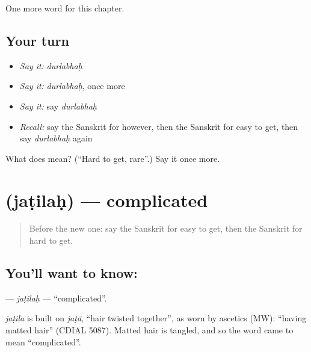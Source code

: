 \begin{grammarlens}[title={What you've built}]
One more word for this chapter.
\end{grammarlens}

\subsection*{Your turn}
\begin{itemize}
\raggedright
  \item \emph{Say it:} \emph{durlabhaḥ}
  \item \emph{Say it:} \emph{durlabhaḥ}, once more
  \item \emph{Say it:} say \emph{durlabhaḥ}
  \item \emph{Recall:} say the Sanskrit for however, then the Sanskrit for easy to get, then say \emph{durlabhaḥ} again
\end{itemize}

\begin{tcolorbox}[breakable,colback=teal!4,colframe=teal!35!black,title={Before you move on}]
What does  mean? (\textquotedblleft{}Hard to get, rare\textquotedblright{}.) Say it once more.
\end{tcolorbox}
\section[\texorpdfstring{\sk{जटिलः} (jaṭilaḥ)}{जटिलः (jaṭilaḥ)}]{ (jaṭilaḥ) — complicated}

\label{lesson:SA-C242-jatilah}



\begin{quote}
Before the new one: say the Sanskrit for easy to get, then the Sanskrit for hard to get.
\end{quote}

\subsection*{You'll want to know: }
\textbf{} — \emph{jaṭilaḥ} — \textquotedblleft{}complicated\textquotedblright{}.

\begin{cousinweb}
\emph{jaṭila} is built on \emph{jaṭā}, \textquotedblleft{}hair twisted together\textquotedblright{}, as worn by ascetics (MW): \textquotedblleft{}having matted hair\textquotedblright{} (CDIAL 5087). Matted hair is tangled, and so the word came to mean \textquotedblleft{}complicated\textquotedblright{}.
\end{cousinweb}

